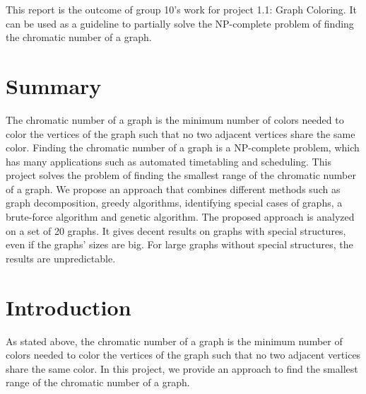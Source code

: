 \documentclass[a4paper]{report}
\begin{document}
	This report is the outcome of group 10's work for project 1.1: Graph Coloring. It can be used as a guideline to partially solve the NP-complete problem of finding the chromatic number of a graph.
	  
	
	\chapter*{Summary}
	The chromatic number of a graph is the minimum number of colors needed to color the vertices of the graph such that no two adjacent vertices share the same color. Finding the chromatic number of a graph is a NP-complete problem, which has many applications such as automated timetabling and scheduling. This project solves the problem of finding the smallest range of the chromatic number of a graph. We propose an approach that combines different methods such as graph decomposition, greedy algorithms, identifying special cases of graphs, a brute-force algorithm and genetic algorithm. The proposed approach is analyzed on a set of 20 graphs. It gives decent results on graphs with special structures, even if the graphs' sizes are big. For large graphs without special structures, the results are unpredictable. 
	
	\tableofcontents
	

	
	\chapter{Introduction}
	As stated above, the chromatic number of a graph is the minimum number of colors needed to color the vertices of the graph such that no two adjacent vertices share the same color. In this project, we provide an approach to find the smallest range of the chromatic number of a graph. \\
	
\end{document}
